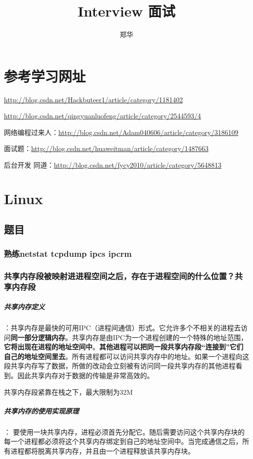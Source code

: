\documentclass[UTF8,a4paper,8pt]{ctexart}
\author{郑华}
\title{Interview 面试}
\begin{document}
 	\maketitle
	\tableofcontents
	
\newpage	
\section{参考学习网址}
	\url{http://blog.csdn.net/Hackbuteer1/article/category/1181402}
	
	\url{http://blog.csdn.net/qingyuanluofeng/article/category/2544593/4}
	
	网络编程过来人：\url{http://blog.csdn.net/Adam040606/article/category/3186109}
	
	面试题：\url{http://blog.csdn.net/huaweitman/article/category/1487663}
	
	后台开发 同道：\url{http://blog.csdn.net/fycy2010/article/category/5648813}
	
\newpage
\section{Linux}
	\subsection{题目}
		\subsubsection{熟练netstat tcpdump ipcs ipcrm}
		\subsubsection{共享内存段被映射进进程空间之后，存在于进程空间的什么位置？共享内存段}
			\subparagraph{共享内存定义}：共享内存是最快的可用IPC（进程间通信）形式。它允许多个不相关的进程去访问\textbf{同一部分逻辑内存}。共享内存是由IPC为一个进程创建的一个特殊的地址范围，\textbf{它将出现在进程的地址空间中}。\textbf{其他进程可以把同一段共享内存段“连接到”它们自己的地址空间里去}。所有进程都可以访问共享内存中的地址。如果一个进程向这段共享内存写了数据，所做的改动会立刻被有访问同一段共享内存的其他进程看到。因此共享内存对于数据的传输是非常高效的。
			
			共享内存段紧靠在栈之下，最大限制为32M
			
			\subparagraph{共享内存的使用实现原理}：
			要使用一块共享内存，进程必须首先分配它。随后需要访问这个共享内存块的每一个进程都必须将这个共享内存绑定到自己的地址空间中。当完成通信之后，所有进程都将脱离共享内存，并且由一个进程释放该共享内存块。
			
\end{document}
